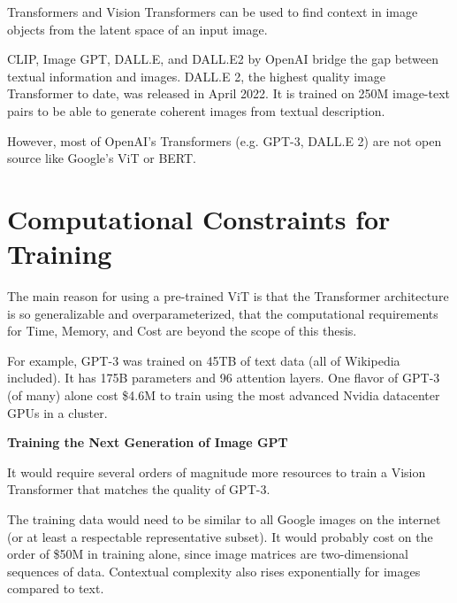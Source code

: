 Transformers and Vision Transformers can be used to find context in image objects from the latent space of an input image.

CLIP, Image GPT, DALL.E, and DALL.E2 by OpenAI bridge the gap between textual information and images.
DALL.E 2, the highest quality image Transformer to date, was released in April 2022.
It is trained on 250M image-text pairs to be able to generate coherent images from textual description. \citep{Dalle2}

\vspace{1mm}

However, most of OpenAI's Transformers (e.g. GPT-3, DALL.E 2) are not open source like Google's ViT or BERT.


\section{Computational Constraints for Training}


The main reason for using a pre-trained ViT is that the Transformer architecture is so generalizable and 
overparameterized, that the computational requirements for Time, Memory, and Cost are beyond the scope of this thesis.


For example, GPT-3 was trained on 45TB of text data (all of Wikipedia included). It has 175B parameters and 96 attention layers. \citep{GPT3}
One flavor of GPT-3 (of many) alone cost \$4.6M to train using the most advanced Nvidia datacenter GPUs in a cluster.

\vspace{10mm}

\textbf{Training the Next Generation of Image GPT}

It would require several orders of magnitude more resources to train a Vision Transformer that matches the quality of GPT-3.

The training data would need to be similar to all Google images on the internet (or at least a respectable representative subset).
It would probably cost on the order of \$50M in training alone, since image matrices are two-dimensional sequences of data.
Contextual complexity also rises exponentially for images compared to text.










